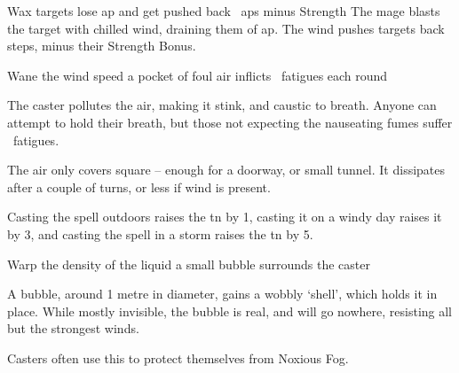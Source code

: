   {\mAir}%
  {Wax}%
  {}%
  {}%
  {targets lose  \gls{ap} and get pushed back ~\glspl{ap} minus Strength}%
  {
    The mage blasts the target with chilled wind, draining them of  \gls{ap}.
    The wind pushes targets back  steps, minus their Strength Bonus.
  }

  {\mAir}%
  {Wane}%
  {}%
  {the wind speed}%
  {a pocket of foul air inflicts ~\glspl{fatigue} each round}%
  {
    The caster pollutes the air, making it stink, and caustic to breath.
    Anyone can attempt to hold their breath, but those not expecting the nauseating fumes suffer ~\glspl{fatigue}.

    The air only covers  square -- enough for a doorway, or small tunnel.
    It dissipates after a couple of turns, or less if wind is present.

    Casting the spell outdoors raises the \gls{tn} by 1, casting it on a windy day raises it by 3, and casting the spell in a storm raises the \gls{tn} by 5.
  }

  {\mAir}%
  {Warp}%
  {}%
  {the density of the liquid}%
  {a small bubble surrounds the caster}%
  {
    A bubble, around 1 metre in diameter, gains a wobbly `shell', which holds it in place.
    While mostly invisible, the bubble is real, and will go nowhere, resisting all but the strongest winds.

    Casters often use this to protect themselves from Noxious Fog.
  }

